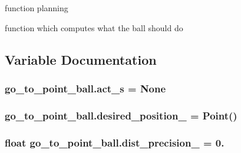 function planning 

function which computes what the ball should do 

\subsection{Variable Documentation}
\subsubsection[{\texorpdfstring{act\+\_\+s}{act_s}}]{\setlength{\rightskip}{0pt plus 5cm}go\+\_\+to\+\_\+point\+\_\+ball.\+act\+\_\+s = None}\hypertarget{namespacego__to__point__ball_a9ac8c67ea55b320e5eb2bdf665173ffa}{}\label{namespacego__to__point__ball_a9ac8c67ea55b320e5eb2bdf665173ffa}
\subsubsection[{\texorpdfstring{desired\+\_\+position\+\_\+}{desired_position_}}]{\setlength{\rightskip}{0pt plus 5cm}go\+\_\+to\+\_\+point\+\_\+ball.\+desired\+\_\+position\+\_\+ = Point()}\hypertarget{namespacego__to__point__ball_ac81a8393fb253c9e0b7255f779f16884}{}\label{namespacego__to__point__ball_ac81a8393fb253c9e0b7255f779f16884}
\subsubsection[{\texorpdfstring{dist\+\_\+precision\+\_\+}{dist_precision_}}]{\setlength{\rightskip}{0pt plus 5cm}float go\+\_\+to\+\_\+point\+\_\+ball.\+dist\+\_\+precision\+\_\+ = 0.}\hypertarget{namespacego__to__point__ball_a9a02c8ca89a09909111972ec4fd317ca}{}\label{namespacego__to__point__ball_a9a02c8ca89a09909111972ec4fd317ca}

